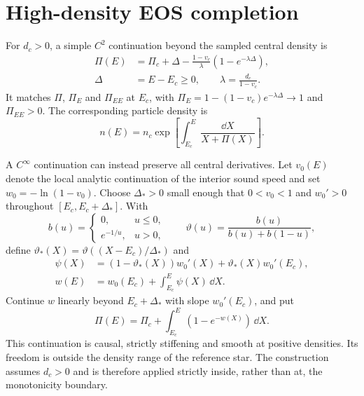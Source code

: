 \section{High-density EOS completion}
\label{app:completion}
For $d_c>0$, a simple $C^2$ continuation beyond the sampled central density is
\begin{align}
 \Pi(E)&=\Pi_c+\Delta-\frac{1-v_c}{\lambda}
                    (1-e^{-\lambda\Delta}),\nonumber\\
 \Delta&=E-E_c\ge0,\qquad \lambda=\frac{d_c}{1-v_c}.
 \label{eq:completion}
\end{align}
It matches $\Pi$, $\Pi_E$ and $\Pi_{EE}$ at $E_c$, with
$\Pi_E=1-(1-v_c)e^{-\lambda\Delta}\to1$ and $\Pi_{EE}>0$.
The corresponding particle density is
\begin{equation}
 n(E)=n_c\exp\left[\int_{E_c}^{E}\frac{\dd X}{X+\Pi(X)}\right].
\end{equation}

A $C^\infty$ continuation can instead preserve all central derivatives. Let $v_0(E)$ denote the local analytic continuation of the interior sound speed and set $w_0=-\ln(1-v_0)$. Choose $\Delta_*>0$ small enough that $0<v_0<1$ and $w_0'>0$ throughout $[E_c,E_c+\Delta_*]$. With
\begin{equation}
 b(u)=\begin{cases}0,&u\le0,\\e^{-1/u},&u>0,\end{cases}
 \qquad \vartheta(u)=\frac{b(u)}{b(u)+b(1-u)},
\end{equation}
define $\vartheta_* (X)=\vartheta((X-E_c)/\Delta_*)$ and
\begin{align}
 \psi(X)&=(1-\vartheta_*(X))w_0'(X)
       +\vartheta_*(X)w_0'(E_c),\nonumber\\
 w(E)&=w_0(E_c)+\int_{E_c}^E\psi(X)\,\dd X.
\end{align}
Continue $w$ linearly beyond $E_c+\Delta_*$ with slope $w_0'(E_c)$, and put
\begin{equation}
 \Pi(E)=\Pi_c+\int_{E_c}^E(1-e^{-w(X)})\,\dd X.
\end{equation}
This continuation is causal, strictly stiffening and smooth at positive densities. Its freedom is outside the density range of the reference star. The construction assumes $d_c>0$ and is therefore applied strictly inside, rather than at, the monotonicity boundary.

